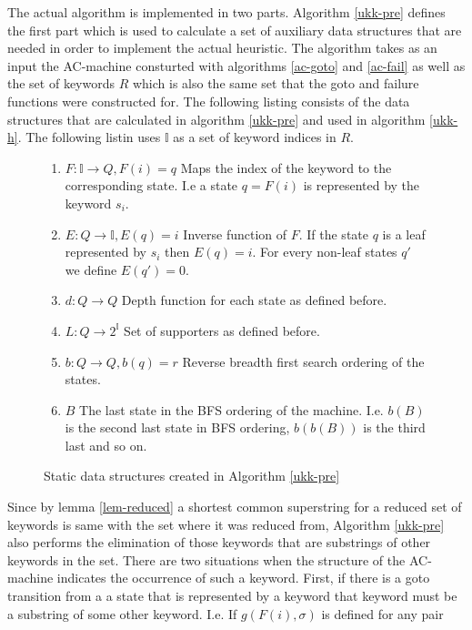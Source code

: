 \documentclass[english,twoside,censored,csm,algorithms-track-2020]{HYthesisML}
\theoremstyle{plain}
\theoremstyle{definition}
\begin{document}
The actual algorithm is implemented in two parts. Algorithm \ref{ukk-pre} defines the first part
which is used to calculate a set of auxiliary data structures that are needed in order to implement
the actual heuristic. The algorithm takes as an input the AC-machine consturted with
algorithms \ref{ac-goto} and \ref{ac-fail} as well as the set of keywords $R$ which is also
the same set that the goto and failure functions were constructed for. 
The following listing consists of the data structures that are calculated
in algorithm \ref{ukk-pre} and used in algorithm \ref{ukk-h}. The following listin uses $\mathbb{I}$ as
a set of keyword indices in $R$.

\begin{figure}[h!]
\begin{enumerate}
  \item $F : \mathbb{I} \rightarrow Q, F(i)=q$ Maps the index of the keyword to the corresponding state. I.e a state $q=F(i)$ is represented by the keyword $s_i$.
  \item $E : Q \rightarrow \mathbb{I}, E(q)=i$ Inverse function of $F$. If the state $q$ is a leaf represented by $s_i$ then $E(q)=i$. For every non-leaf states $q'$ we define $E(q')=0$.
  \item $d : Q \rightarrow Q$ Depth function for each state as defined before.
  \item $L : Q \rightarrow 2^{\mathbb{I}}$ Set of supporters as defined before.
  \item $b : Q \rightarrow Q, b(q)=r$ Reverse breadth first search ordering of the states.
  \item $B$ The last state in the BFS ordering of the machine. I.e. $b(B)$ is the second last state in BFS ordering, $b(b(B))$ is the third last and so on.
\end{enumerate}
\caption{Static data structures created in Algorithm \ref{ukk-pre}} \label{lst-auxiliary-data}
\end{figure}
Since by lemma \ref{lem-reduced} a shortest common superstring for a reduced set of keywords
is same with the set where it was reduced from, Algorithm \ref{ukk-pre} also performs
the elimination of those keywords that are substrings of other keywords in the set. There are two
situations when the structure of the AC-machine indicates the occurrence of such a keyword. First,
if there is a goto transition from a a state that is represented by a keyword that keyword
must be a substring of some other keyword. I.e. If $g(F(i),\sigma)$ is defined for any pair
\end{document}
